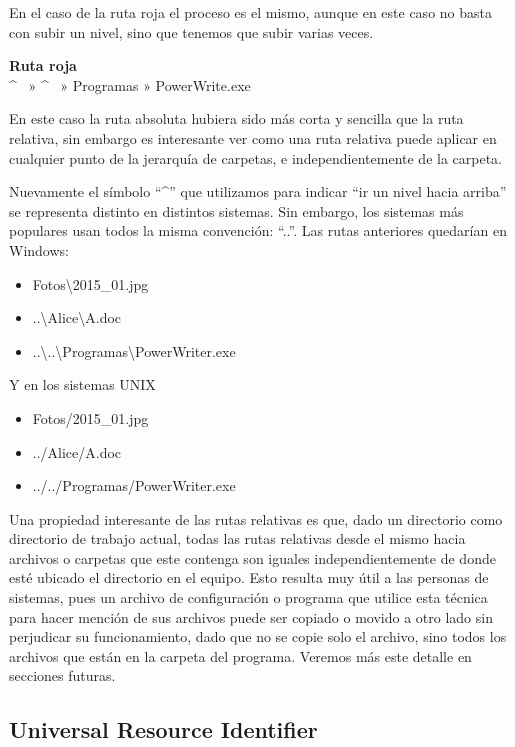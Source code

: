 En el caso de la ruta roja el proceso es el mismo, aunque en este caso no basta
con subir un nivel, sino que tenemos que subir varias veces.

\begin{example}
    \textbf{Ruta roja}\\
    \textasciicircum ~ » \textasciicircum ~ » Programas » PowerWrite.exe
\end{example}

En este caso la ruta absoluta hubiera sido más corta y sencilla que la ruta relativa,
sin embargo es interesante ver como una ruta relativa puede aplicar en cualquier
punto de la jerarquía de carpetas, e independientemente de la carpeta.

Nuevamente el símbolo ``\textasciicircum'' que utilizamos para indicar ``ir un nivel hacia arriba''
se representa distinto en distintos sistemas. Sin embargo, los sistemas más populares
usan todos la misma convención: ``..''. Las rutas anteriores quedarían en Windows:

\begin{itemize}
    \item Fotos\textbackslash 2015\_01.jpg
    \item ..\textbackslash Alice\textbackslash A.doc
    \item ..\textbackslash ..\textbackslash Programas\textbackslash PowerWriter.exe
\end{itemize}

Y en los sistemas UNIX
\begin{itemize}
    \item Fotos/2015\_01.jpg
    \item ../Alice/A.doc
    \item ../../Programas/PowerWriter.exe
\end{itemize}

Una propiedad interesante de las rutas relativas es que, dado un directorio
como directorio de trabajo actual, todas las rutas relativas desde el mismo
hacia archivos o carpetas que este contenga son iguales independientemente de
donde esté ubicado el directorio en el equipo. Esto resulta muy útil a las personas
de sistemas, pues un archivo de configuración o programa que utilice esta técnica
para hacer mención de sus archivos puede ser copiado o movido a otro lado sin
perjudicar su funcionamiento, dado que no se copie solo el archivo, sino todos
los archivos que están en la carpeta del programa. Veremos más este detalle en
secciones futuras.

\subsection{Universal Resource Identifier}

